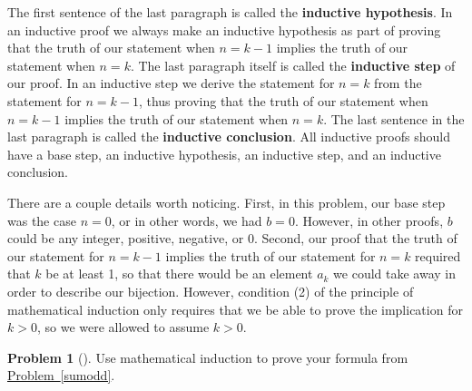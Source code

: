 \documentclass[10pt,]{book}
\newcommand{\terminology}[1]{\textbf{#1}}
\theoremstyle{plain}
\theoremstyle{definition}
\newtheorem{activity}[project]{Problem}
\theoremstyle{definition}
\numberwithin{equation}{chapter}
\begin{document}
The first sentence of the last paragraph is called the \terminology{inductive hypothesis}. In an inductive proof we always make an inductive hypothesis as part of proving that the truth of our statement when \(n=k-1\) implies the truth of our statement when \(n=k\). The last paragraph itself is called the \terminology{inductive step} of our proof. In an inductive step we derive the statement for \(n=k\) from the statement for \(n=k-1\), thus proving that the truth of our statement when \(n=k-1\) implies the truth of our statement when \(n=k\). The last sentence in the last paragraph is called the \terminology{inductive conclusion}. All inductive proofs should have a base step, an inductive hypothesis, an inductive step, and an inductive conclusion.%
\par
There are a couple details worth noticing. First, in this problem, our base step was the case \(n=0\), or in other words, we had \(b=0\). However, in other proofs, \(b\) could be any integer, positive, negative, or 0. Second, our proof that the truth of our statement for \(n=k-1\) implies the truth of our statement for \(n=k\) required that \(k\) be at least 1, so that there would be an element \(a_k\) we could take away in order to describe our bijection. However, condition (2) of the principle of mathematical induction only requires that we be able to prove the implication for \(k>0\), so we were allowed to assume \(k>0\).%
\begin{activity}[]\marginsymbol[-1em]{} \label{activity-362}
Use mathematical induction to prove your formula from \hyperref[sumodd]{Problem~\ref{sumodd}}.%
\end{activity}
\typeout{************************************************}
\typeout{************************************************}
\end{document}
